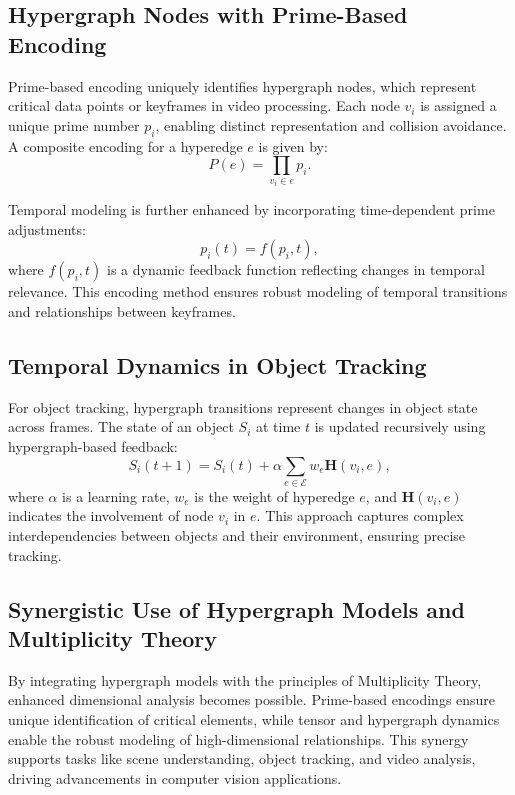 \documentclass{article}
\theoremstyle{plain}
\begin{document}
\subsection{Hypergraph Nodes with Prime-Based Encoding}
Prime-based encoding uniquely identifies hypergraph nodes, which represent critical data points or keyframes in video processing. Each node \( v_i \) is assigned a unique prime number \( p_i \), enabling distinct representation and collision avoidance. A composite encoding for a hyperedge \( e \) is given by:
\begin{equation}
P(e) = \prod_{v_i \in e} p_i.
\end{equation}

Temporal modeling is further enhanced by incorporating time-dependent prime adjustments:
\begin{equation}
p_i(t) = f(p_i, t),
\end{equation}
where \( f(p_i, t) \) is a dynamic feedback function reflecting changes in temporal relevance. This encoding method ensures robust modeling of temporal transitions and relationships between keyframes.

\subsection{Temporal Dynamics in Object Tracking}
For object tracking, hypergraph transitions represent changes in object state across frames. The state of an object \( S_i \) at time \( t \) is updated recursively using hypergraph-based feedback:
\begin{equation}
S_i(t+1) = S_i(t) + \alpha \sum_{e \in \mathcal{E}} w_e \mathbf{H}(v_i, e),
\end{equation}
where \( \alpha \) is a learning rate, \( w_e \) is the weight of hyperedge \( e \), and \( \mathbf{H}(v_i, e) \) indicates the involvement of node \( v_i \) in \( e \). This approach captures complex interdependencies between objects and their environment, ensuring precise tracking.

\subsection{Synergistic Use of Hypergraph Models and Multiplicity Theory}
By integrating hypergraph models with the principles of Multiplicity Theory, enhanced dimensional analysis becomes possible. Prime-based encodings ensure unique identification of critical elements, while tensor and hypergraph dynamics enable the robust modeling of high-dimensional relationships. This synergy supports tasks like scene understanding, object tracking, and video analysis, driving advancements in computer vision applications.
\end{document}
